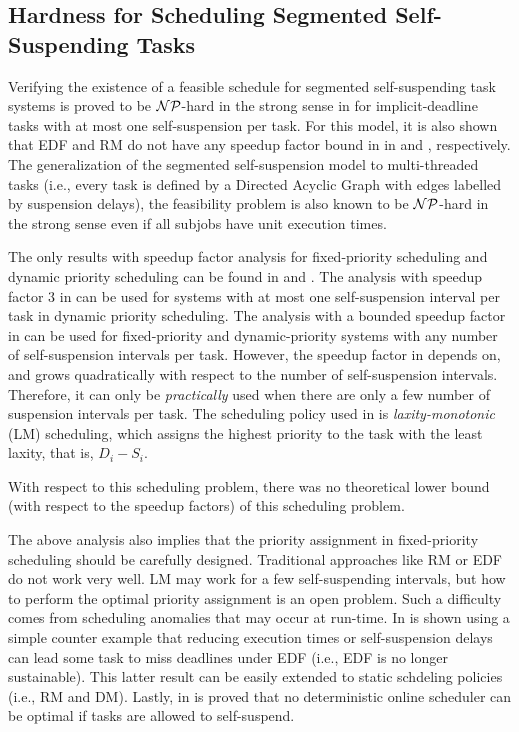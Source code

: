 \subsection{Hardness for Scheduling Segmented Self-Suspending Tasks}
Verifying the existence of a feasible schedule for segmented self-suspending task systems is proved to be ${\cal NP}$-hard in the strong sense in \cite{Ridouard_2004} for implicit-deadline tasks with at most one self-suspension per task. For this model, it is also shown that EDF and RM do not have any speedup factor bound in in \cite{Ridouard_2004} and \cite{RTSS-ChenL14}, respectively. The generalization of the segmented self-suspension model to multi-threaded tasks (i.e., every task is defined by a Directed Acyclic Graph with edges labelled by suspension delays), the feasibility problem is also known to be  ${\cal NP}$-hard in the strong sense  \cite{Ric03} even if all subjobs have unit execution times. 

The only results with speedup factor analysis for fixed-priority scheduling and dynamic priority scheduling can be found in \cite{RTSS-ChenL14} and \cite{WC16-suspend-DATE}. The analysis with speedup factor $3$ in \cite{RTSS-ChenL14} can be used for systems with at most one self-suspension interval per task in dynamic priority scheduling. The analysis with a bounded speedup factor in \cite{WC16-suspend-DATE} can be used for fixed-priority and dynamic-priority systems with any number of self-suspension intervals per task. However, the speedup factor in \cite{WC16-suspend-DATE} depends on, and grows quadratically with respect to the number of self-suspension intervals. Therefore, it can only be \emph{practically} used when there are only a few number of suspension intervals per task. The scheduling policy used in \cite{WC16-suspend-DATE} is \emph{laxity-monotonic} (LM) scheduling, which assigns the highest priority to the task with the least laxity, that is, $D_i-S_i$.

With respect to this scheduling problem, there was no theoretical lower bound (with respect to the speedup factors) of this scheduling problem. 


The above analysis also implies that the priority assignment in fixed-priority scheduling should be carefully designed. Traditional approaches like RM or EDF do not work very well. LM may work for a few self-suspending intervals, but how to perform the optimal priority assignment is an open problem. Such a difficulty comes from scheduling anomalies that may occur at run-time. In \cite{Ridouard_2004} is shown using a simple counter example that reducing execution times or self-suspension delays can lead some task to miss deadlines under EDF (i.e., EDF is no longer sustainable). This latter result can be easily extended to static schdeling policies (i.e., RM and DM). Lastly, in \cite{RidouardR06} is proved that no deterministic online scheduler can be optimal if tasks are allowed to self-suspend.


